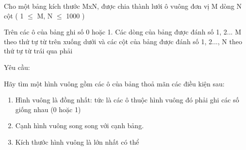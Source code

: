Cho một bảng kích thước MxN, được chia thành lưới ô vuông đơn vị M dòng N cột ( 1  $\le$  M, N  $\le$  1000 )

Trên các ô của bảng ghi số 0 hoặc 1. Các dòng của bảng được đánh số 1, 2... M theo thứ tự từ trên xuống dưới và các cột của bảng được đánh số 1, 2..., N theo thứ tự từ trái qua phải

Yêu cầu:

Hãy tìm một hình vuông gồm các ô của bảng thoả mãn các điều kiện sau:
\begin{enumerate}
	\item Hình vuông là đồng nhất: tức là các ô thuộc hình vuông đó phải ghi các số giống nhau (0 hoặc 1)
	\item Cạnh hình vuông song song với cạnh bảng.
	\item Kích thước hình vuông là lớn nhất có thể
\end{enumerate}